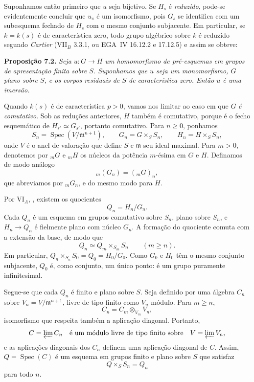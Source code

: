 Suponhamos então primeiro que \(u\) seja bijetivo. Se \(H_s\) é
\emph{reduzido}, pode-se evidentemente concluir que \(u_s\) é um
isomorfismo, pois \(G_s\) se identifica com um subesquema fechado de
\(H_s\) com o mesmo conjunto subjacente. Em particular, se \(k=k(s)\)
é de característica zero, todo grupo algébrico sobre \(k\) é
reduzido segundo \emph{Cartier} (VII\(_B\) 3.3.1, ou EGA~IV
16.12.2 e 17.12.5) e assim se obteve:

\medskip
\noindent{}\textbf{Proposição 7.2.}
\textit{Seja \(u:G\to H\) um homomorfismo de pré-esquemas em grupos de
apresentação finita sobre \(S\). Suponhamos que \(u\) seja um monomorfismo,
\(G\) plano sobre \(S\), e os corpos residuais de \(S\) de característica
zero. Então \(u\) é uma imersão.}

Quando \(k(s)\) é de característica \(p>0\), vamos nos limitar ao caso
em que \(G\) \emph{é comutativo}. Sob as reduções
anteriores, \(H\) também é comutativo, porque é o fecho
esquemático de \(H_{s'}\simeq G_{s'}\), portanto comutativo. Para \(n\geq0\), ponhamos
\[
  S_n=\operatorname{Spec}(V/\mathfrak m^{n+1}),\qquad
  G_n=G\times_SS_n,\qquad H_n=H\times_SS_n,
\]
onde \(V\) é o anel de valoração que define \(S\) e \(\mathfrak m\)
seu ideal maximal. Para \(m>0\), denotemos por \({}_mG\) e \({}_mH\) os
núcleos da potência \(m\)-ésima em \(G\) e \(H\). Definamos de modo
análogo
\[
  {}_m(G_n)=({}_mG)_n,
\]
que abreviamos por \({}_mG_n\), e do mesmo modo para \(H\).

Por VI\(_A\), , existem os
quocientes
\[
  Q_n=H_n/G_n.
\]
Cada \(Q_n\) é um esquema em grupos comutativo sobre \(S_n\), plano sobre
\(S_n\), e \(H_n\to Q_n\) é fielmente plano com núcleo \(G_n\). A
formação do quociente comuta com a extensão da base, de
modo que
\[
  Q_n\simeq Q_m\times_{S_m}S_n\qquad(m\geq n).
\]
Em particular, \(Q_n\times_{S_n}S_0=Q_0=H_0/G_0\). Como \(G_0\) e
\(H_0\) têm o mesmo conjunto subjacente, \(Q_0\) é, como conjunto, um
único ponto: é um grupo puramente infinitesimal.

Segue-se que cada \(Q_n\) é finito e plano sobre \(S\). Seja definido por
uma álgebra \(C_n\) sobre \(V_n=V/\mathfrak m^{n+1}\), livre de tipo finito como
\(V_n\)-módulo. Para \(m\geq n\),
\[
  C_n=C_m\otimes_{V_m}V_n,
\]
isomorfismo que respeita também a aplicação diagonal. Portanto,
\[
  C=\varprojlim C_n
  \quad\text{é um módulo livre de tipo finito sobre}\quad
  V=\varprojlim V_n,
\]
e as aplicações diagonais dos \(C_n\) definem uma aplicação diagonal de \(C\). Assim,
\(Q=\operatorname{Spec}(C)\) é um esquema em grupos finito e plano sobre
\(S\) que satisfaz
\[
  Q\times_SS_n=Q_n
\]
para todo \(n\).

